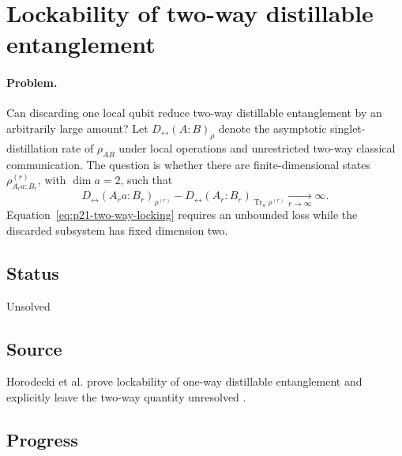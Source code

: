 \section{Lockability of two-way distillable entanglement}
\label{sec:op_7ceb25c3fe5c9403}

\paragraph{Problem.}
Can discarding one local qubit reduce two-way distillable entanglement by an
arbitrarily large amount?  Let $D_{\leftrightarrow}(A:B)_\rho$ denote the
asymptotic singlet-distillation rate of $\rho_{AB}$ under local operations and
unrestricted two-way classical communication.  The question is whether there
are finite-dimensional states $\rho^{(r)}_{A_ra:B_r}$, with $\dim a=2$, such
that
\begin{equation}
  D_{\leftrightarrow}(A_ra:B_r)_{\rho^{(r)}}
  -D_{\leftrightarrow}(A_r:B_r)_{\operatorname{Tr}_a\rho^{(r)}}
  \xrightarrow[r\to\infty]{}\infty.
  \label{eq:p21-two-way-locking}
\end{equation}
Equation~\eqref{eq:p21-two-way-locking} requires an unbounded loss while the
discarded subsystem has fixed dimension two.

\subsection*{Status}

Unsolved

\subsection*{Source}

Horodecki et al. prove lockability of one-way distillable entanglement and
explicitly leave the two-way quantity unresolved
.

\subsection*{Progress}

